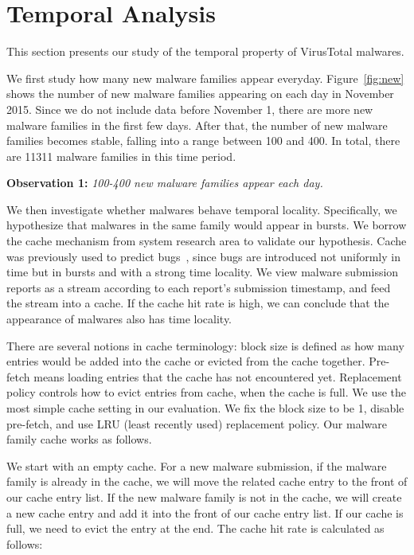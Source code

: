 
\section{Temporal Analysis}
\label{sec:temporal}

This section presents our study of the temporal property of VirusTotal malwares. 



We first study how many new malware families appear everyday. 
Figure~\ref{fig:new} shows the number of new malware families appearing on each day in November 2015. 
Since we do not include data before November 1, 
there are more new malware families in the first few days.
After that, the number of new malware families becomes stable, 
falling into a range between 100 and 400. 
In total, there are 11311 malware families in this time period. 

{\bf Observation 1:} 
{\em 100-400 new malware families appear each day.}







We then investigate whether malwares behave temporal locality.
Specifically, we hypothesize that malwares in the same family would appear in bursts.  
We borrow the cache mechanism from system research area to validate our hypothesis. 
Cache was previously used to predict bugs~\cite{predicting}, 
since bugs are introduced not uniformly in time but in bursts and with a strong time locality. 
We view malware submission reports as a stream according to each report's submission timestamp, and feed the stream into a cache. 
If the cache hit rate is high, 
we can conclude that the appearance of malwares also has time locality. 

There are several notions in cache terminology: 
block size is defined as how many entries would be added into the cache or evicted from the cache together.
Pre-fetch means loading entries that the cache has not encountered yet. 
Replacement policy controls how to evict entries from cache, when the cache is full. 
We use the most simple cache setting in our evaluation. We fix the block size to be 1, disable pre-fetch, 
and use LRU (least recently used) replacement policy.
Our malware family cache works as follows.

We start with an empty cache. 
For a new malware submission, if the malware family is already in the cache, 
we will move the related cache entry to the front of our cache entry list. 
If the new malware family is not in the cache, 
we will create a new cache entry and add it into the front of our cache entry list. 
If our cache is full, we need to evict the entry at the end. 
The cache hit rate is calculated as follows: 

